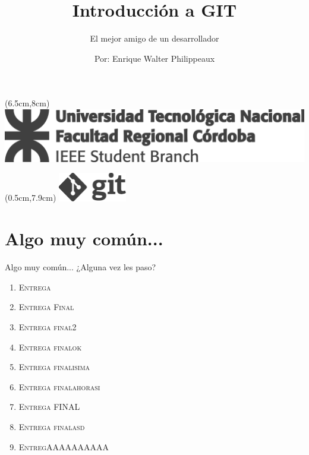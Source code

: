 \documentclass{beamer}
\title{Introducción a GIT}
\subtitle{El mejor amigo de un desarrollador}
\author{Por: Enrique Walter Philippeaux}
\date{}
\begin{document}
    \begin{frame}
        \begin{textblock*}{.5\textwidth}(6.5cm,8cm) %
        \includegraphics[width=\textwidth]{logochicogris.pdf}
        \end{textblock*}
        
        \begin{textblock*}{3cm}(0.5cm,7.9cm) %
        \includegraphics[width=3cm]{gitlogogris.pdf}
        \end{textblock*}
        \maketitle
    \end{frame}
    
    
    \section{Algo muy común...}
    \begin{frame}{Algo muy común...}
    ¿Alguna vez les paso?\pause
    \begin{enumerate}
        \item \textsc{Entrega}\pause
        \item \textsc{Entrega Final}\pause
        \item \textsc{Entrega final2}\pause
        \item \textsc{Entrega finalok}\pause
        \item \textsc{Entrega finalisima}\pause
        \item \textsc{Entrega finalahorasi}\pause
        \item \textsc{Entrega FINAL}\pause
        \item \textsc{Entrega finalasd}\pause
        \item \textsc{EntregAAAAAAAAAA}
    \end{enumerate}
    \end{frame}
    
\end{document}
